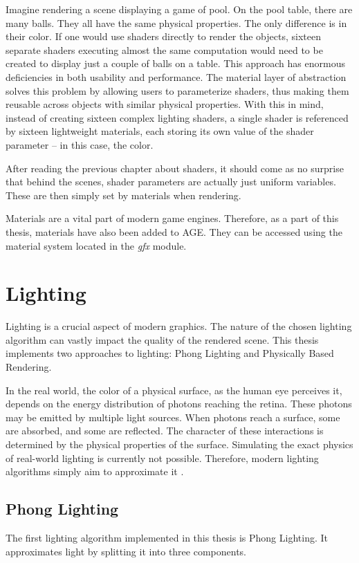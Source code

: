 \documentclass[
  digital,     %
  oneside,     %
  nosansbold,  %
  nocolorbold, %
  lof,         %
  lot,         %
]{fithesis4}
\begin{document}
Imagine rendering a scene displaying a game of pool. On the pool table, there are many balls.
They all have the same physical properties. The only difference is in their color.
If one would use shaders directly to render the objects, sixteen separate
shaders executing almost the same computation would need to be created to display just a couple of balls on a table.
This approach has enormous deficiencies in both usability and performance.
The material layer of abstraction solves this problem by allowing users to parameterize shaders,
thus making them reusable across objects with similar physical properties. With this in mind, instead of creating sixteen
complex lighting shaders, a single shader is referenced by sixteen lightweight materials, each storing its own value
of the shader parameter -- in this case, the color.

After reading the previous chapter about shaders, it should come as no surprise that behind the scenes,
shader parameters are actually just uniform variables. These are then simply set by materials when rendering.

Materials are a vital part of modern game engines. Therefore, as a part of this thesis, materials have also been added to AGE.
They can be accessed using the material system located in the \textit{gfx} module.

\chapter{Lighting}
Lighting is a crucial aspect of modern graphics. The nature of the chosen lighting algorithm can vastly impact
the quality of the rendered scene. This thesis implements two approaches to lighting: Phong Lighting and
Physically Based Rendering.

In the real world, the color of a physical surface, as the human eye perceives it, depends on the
energy distribution of photons reaching the retina. These photons may be emitted by multiple light sources.
When photons reach a surface, some are absorbed, and some are reflected.
The character of these interactions is determined by the physical properties of the surface.
Simulating the exact physics of real-world lighting is currently not possible. Therefore,
modern lighting algorithms simply aim to approximate it \cite[p.207]{opengl-book}.

\section{Phong Lighting}
The first lighting algorithm implemented in this thesis is Phong Lighting.
It approximates light by splitting it into three components.
\end{document}
